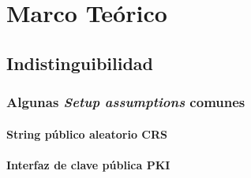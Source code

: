 \chapter{Marco Teórico}

\begin{definicion}
\end{definicion}

\section{Indistinguibilidad}

\subsection{Algunas \textit{Setup assumptions} comunes}
\subsubsection{String público aleatorio CRS}
\subsubsection{Interfaz de clave pública PKI}

